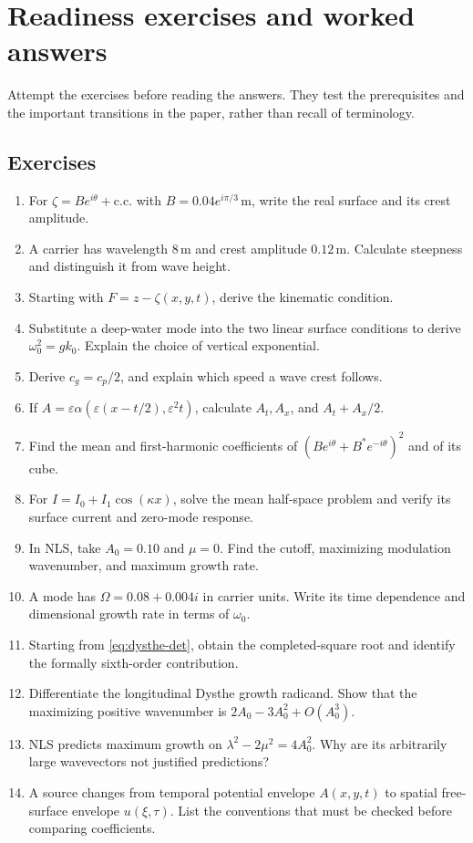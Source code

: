 \section{Readiness exercises and worked answers}
\label{sec:exercises}
Attempt the exercises before reading the answers. They test the prerequisites
and the important transitions in the paper, rather than recall of terminology.

\subsection{Exercises}
\begin{enumerate}[label=\textbf{\arabic*.}]
\item For $\zeta=Be^{i\theta}+\mathrm{c.c.}$ with
$B=0.04e^{i\pi/3}\,\mathrm{m}$, write the real surface and its crest amplitude.
\item A carrier has wavelength $8\,\mathrm{m}$ and crest amplitude
$0.12\,\mathrm{m}$. Calculate steepness and distinguish it from wave height.
\item Starting with $F=z-\zeta(x,y,t)$, derive the kinematic condition.
\item Substitute a deep-water mode into the two linear surface conditions
to derive $\omega_0^2=gk_0$. Explain the choice of vertical exponential.
\item Derive $c_g=c_p/2$, and explain which speed a wave crest follows.
\item If $A=\varepsilon\alpha(\varepsilon(x-t/2),\varepsilon^2t)$,
calculate $A_t,A_x$, and $A_t+A_x/2$.
\item Find the mean and first-harmonic coefficients of
$(Be^{i\theta}+B^*e^{-i\theta})^2$ and of its cube.
\item For $I=I_0+I_1\cos(\kappa x)$, solve the mean half-space problem
and verify its surface current and zero-mode response.
\item In NLS, take $A_0=0.10$ and $\mu=0$. Find the cutoff, maximizing
modulation wavenumber, and maximum growth rate.
\item A mode has $\Omega=0.08+0.004i$ in carrier units. Write its time
dependence and dimensional growth rate in terms of $\omega_0$.
\item Starting from \eqref{eq:dysthe-det}, obtain the completed-square
root and identify the formally sixth-order contribution.
\item Differentiate the longitudinal Dysthe growth radicand. Show that
the maximizing positive wavenumber is $2A_0-3A_0^2+O(A_0^3)$.
\item NLS predicts maximum growth on $\lambda^2-2\mu^2=4A_0^2$.
Why are its arbitrarily large wavevectors not justified predictions?
\item A source changes from temporal potential envelope $A(x,y,t)$ to
spatial free-surface envelope $u(\xi,\tau)$. List the conventions that
must be checked before comparing coefficients.
\end{enumerate}

